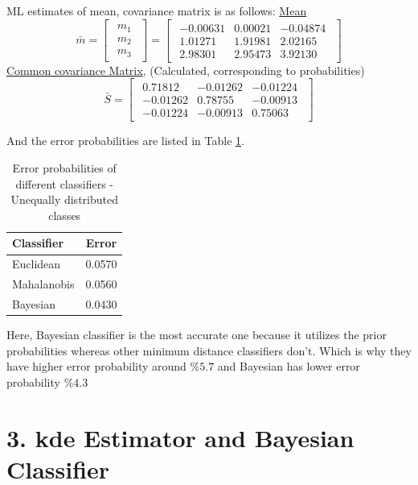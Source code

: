 \documentclass[11pt]{article}
\begin{document}
ML estimates of mean, covariance matrix is as follows: \medskip
\underline{Mean}
$$
\bar{m}=
 \begin{bmatrix}
 \begin{array}{c}
    m_1 \\
    m_2 \\
    m_3 
\end{array}   
\end{bmatrix} = 
 \begin{bmatrix}
 \begin{array}{rrr}
-0.00631  & 0.00021 & -0.04874 \\
 1.01271  & 1.91981 &  2.02165 \\
 2.98301  & 2.95473 &  3.92130
\end{array}   
\end{bmatrix}
$$
\underline{Common covariance Matrix}, (Calculated, corresponding to probabilities)
$$
\bar{S}=
 \begin{bmatrix}
 \begin{array}{rrr}
 0.71812 & -0.01262 & -0.01224 \\
-0.01262 &  0.78755 & -0.00913 \\
-0.01224 & -0.00913 &  0.75063
\end{array}   
\end{bmatrix}
$$

And the error probabilities are listed in Table \ref{errq2}.

\bgroup
\def\arraystretch{1.5}%
\begin{table}[H]
\centering
\caption{Error probabilities of different classifiers - Unequally distributed classes}
\begin{tabular}{|l|c|}
\hline
\textbf{Classifier}   & \textbf{Error}\\ \hline
Euclidean    & 0.0570\\ \hline
Mahalanobis  & 0.0560\\ \hline
Bayesian     & 0.0430\\ \hline
\end{tabular}
\label{errq2}
\end{table}
\egroup

Here, Bayesian classifier is the most accurate one because it utilizes the prior probabilities whereas other minimum distance classifiers don't. Which is why they have higher error probability around $\%5.7$ and Bayesian has lower error probability $\%4.3$

\section*{3. kde Estimator and Bayesian Classifier}
\end{document}
